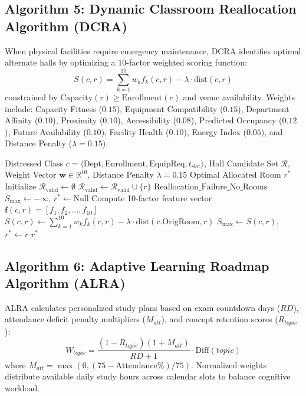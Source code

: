 \documentclass[conference]{IEEEtran}
\begin{document}
\subsection{Algorithm 5: Dynamic Classroom Reallocation Algorithm (DCRA)}
When physical facilities require emergency maintenance, DCRA identifies optimal alternate halls by optimizing a 10-factor weighted scoring function:
\begin{equation}
S(c, r) = \sum_{k=1}^{10} w_k f_k(c, r) - \lambda \cdot \mathrm{dist}(c, r)
\label{eq:dcra}
\end{equation}
constrained by $\text{Capacity}(r) \ge \text{Enrollment}(c)$ and venue availability. Weights include: Capacity Fitness ($0.15$), Equipment Compatibility ($0.15$), Department Affinity ($0.10$), Proximity ($0.10$), Accessibility ($0.08$), Predicted Occupancy ($0.12$), Future Availability ($0.10$), Facility Health ($0.10$), Energy Index ($0.05$), and Distance Penalty ($\lambda = 0.15$).

\begin{algorithm}[htbp]
\caption{Dynamic Classroom Reallocation Algorithm (DCRA)}
\label{alg:dcra}
\begin{algorithmic}[1]
\REQUIRE Distressed Class $c = \langle \text{Dept}, \text{Enrollment}, \text{EquipReq}, t_{\text{slot}} \rangle$, Hall Candidate Set $\mathcal{R}$, Weight Vector $\mathbf{w} \in \mathbb{R}^{10}$, Distance Penalty $\lambda = 0.15$
\ENSURE Optimal Allocated Room $r^*$
\STATE Initialize $\mathcal{R}_{\text{valid}} \leftarrow \emptyset$
        \STATE $\mathcal{R}_{\text{valid}} \leftarrow \mathcal{R}_{\text{valid}} \cup \{r\}$
    \ENDIF
\ENDFOR
{}
    \RETURN $\text{Reallocation\_Failure\_No\_Rooms}$
\ENDIF
\STATE $S_{\max} \leftarrow -\infty$, $r^* \leftarrow \text{Null}$
    \STATE Compute 10-factor feature vector $\mathbf{f}(c, r) = [f_1, f_2, \dots, f_{10}]$
    \STATE $S(c, r) \leftarrow \sum_{k=1}^{10} w_k f_k(c, r) - \lambda \cdot \mathrm{dist}(c.\text{OrigRoom}, r)$
        \STATE $S_{\max} \leftarrow S(c, r)$, $r^* \leftarrow r$
    \ENDIF
\ENDFOR
\RETURN $r^*$
\end{algorithmic}
\end{algorithm}

\subsection{Algorithm 6: Adaptive Learning Roadmap Algorithm (ALRA)}
ALRA calculates personalized study plans based on exam countdown days ($RD$), attendance deficit penalty multipliers ($M_{att}$), and concept retention scores ($R_{topic}$):
\begin{equation}
W_{topic} = \frac{(1 - R_{topic})(1 + M_{att})}{RD + 1} \cdot \mathrm{Diff}(topic)
\end{equation}
where $M_{att} = \max(0, (75 - \text{Attendance\%})/75)$. Normalized weights distribute available daily study hours across calendar slots to balance cognitive workload.
\end{document}
